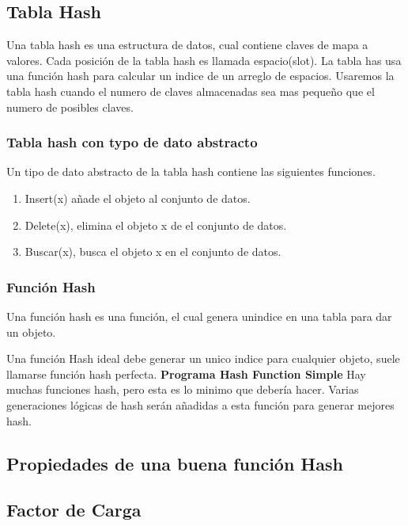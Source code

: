 \documentclass[../Book.tex]{subfiles}
\begin{document}
\subsection{Tabla Hash}
Una tabla hash es una estructura de datos, cual contiene claves de mapa a valores. Cada posición de la tabla hash es llamada espacio(slot). La tabla has usa una función hash para calcular un indice de un arreglo de espacios. Usaremos la tabla hash cuando el numero de claves almacenadas sea mas pequeño que el numero de posibles claves.

\subsubsection{Tabla hash con typo de dato abstracto}
Un tipo de dato abstracto de la tabla hash contiene las siguientes funciones.
\begin{enumerate}
\item Insert(x) añade el objeto al conjunto de datos.
\item Delete(x), elimina el objeto x de el conjunto de datos.
\item Buscar(x), busca el objeto x en el conjunto de datos.
\end{enumerate}
\subsubsection{Función Hash}
Una función hash es una función, el cual genera unindice en una tabla para dar un objeto.

Una función Hash ideal debe generar un unico indice para cualquier objeto, suele llamarse función hash perfecta.
\textbf{Programa Hash Function Simple}
Hay muchas funciones hash, pero esta es lo minimo que debería hacer. Varias generaciones lógicas de hash serán añadidas a esta función para generar mejores hash.
\subsection{Propiedades de una buena función Hash}
\subsection{Factor de Carga}
\end{document}
